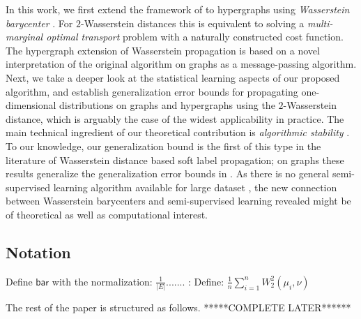 \documentclass[letterpaper]{article} %
\begin{document}
In this work, we first extend the framework of \cite{Solomon:2014} to hypergraphs using \textit{Wasserstein barycenter} \cite{Wasserstein_Barycenter,Hypergraph_Asoodeh}. For $2$-Wasserstein distances this is equivalent to solving a \emph{multi-marginal optimal transport} \cite{CE2010} problem with a naturally constructed cost function. The hypergraph extension of Wasserstein propagation is based on a novel interpretation of the original algorithm on graphs \cite{Solomon:2014} as a message-passing algorithm. Next, we take a deeper look at the statistical learning aspects of our proposed algorithm, and establish generalization error bounds for propagating one-dimensional distributions on graphs and hypergraphs using the $2$-Wasserstein distance, which is arguably the case of the widest applicability in practice. The main technical ingredient of our theoretical contribution is \textit{algorithmic stability} \cite{Algorithmic_Stability}. To our knowledge, our generalization bound is the first of this type in the literature of Wasserstein distance based soft label propagation; on graphs these results generalize the generalization error bounds in \cite{Belkin2004}. As there is no general semi-supervised learning algorithm available for large dataset \cite{Label_Propa_100}, the new connection between Wasserstein barycenters and semi-supervised learning revealed might be of theoretical as well as computational interest.




\subsection{Notation}

Define $\mathsf{bar}$  with the normalization: $\frac{1}{|E|}$....... 
{\color{blue}:  Define: $\frac{1}{n}\sum_{i=1}^nW^2_2(\mu_i, \nu)$}

The rest of the paper is structured as follows.  *****COMPLETE LATER******
~\\
~\\
\end{document}
